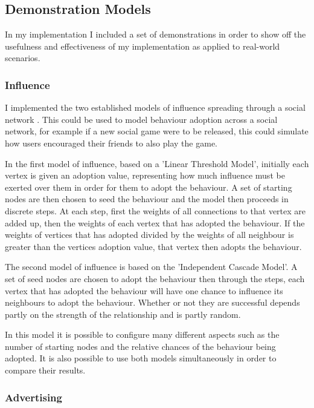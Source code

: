 \documentclass[12pt,a4paper]{article}
\begin{document}
\subsection{Demonstration Models}
\noindent
In my implementation I included a set of demonstrations in order to show off the usefulness and effectiveness of my implementation as applied to real-world scenarios.

\subsubsection{Influence}

I implemented the two established models of influence spreading through a social network \cite{kempe2003maximizing}. This could be used to model behaviour adoption across a social network, for example if a new social game were to be released, this could simulate how users encouraged their friends to also play the game.

In the first model of influence, based on a 'Linear Threshold Model', initially each vertex is given an adoption value, representing how much influence must be exerted over them in order for them to adopt the behaviour. A set of starting nodes are then chosen to seed the behaviour and the model then proceeds in discrete steps. At each step, first the weights of all connections to that vertex are added up, then the weights of each vertex that has adopted the behaviour. If the weights of vertices that has adopted divided by the weights of all neighbour is greater than the vertices adoption value, that vertex then adopts the behaviour.

The second model of influence is based on the 'Independent Cascade Model'. A set of seed nodes are chosen to adopt the behaviour then through the steps, each vertex that has adopted the behaviour will have one chance to influence its neighbours to adopt the behaviour. Whether or not they are successful depends partly on the strength of the relationship and is partly random.

In this model it is possible to configure many different aspects such as the number of starting nodes and the relative chances of the behaviour being adopted. It is also possible to use both models simultaneously in order to compare their results.

\subsubsection{Advertising}
\end{document}
